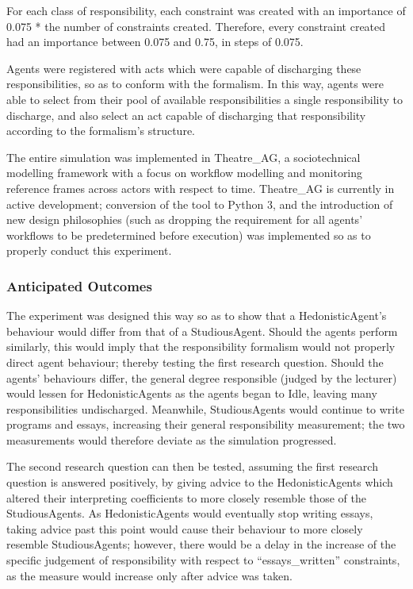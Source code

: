 For each class of responsibility, each constraint was created with an importance of 0.075 * the number of constraints created. Therefore, every constraint created had an importance between 0.075 and 0.75, in steps of 0.075.\par

Agents were registered with acts which were capable of discharging these responsibilities, so as to conform with the formalism. In this way, agents were able to select from their pool of available responsibilities a single responsibility to discharge, and also select an act capable of discharging that responsibility according to the formalism's structure.\par

The entire simulation was implemented in Theatre\_AG\cite{theatre_code}, a sociotechnical modelling framework with a focus on workflow modelling and monitoring reference frames across actors with respect to time. Theatre\_AG is currently in active development; conversion of the tool to Python 3, and the introduction of new design philosophies (such as dropping the requirement for all agents' workflows to be predetermined before execution) was implemented so as to properly conduct this experiment.\par

\subsubsection{Anticipated Outcomes}

The experiment was designed this way so as to show that a HedonisticAgent's behaviour would differ from that of a StudiousAgent. Should the agents perform similarly, this would imply that the responsibility formalism would not properly direct agent behaviour; thereby testing the first research question. Should the agents' behaviours differ, the general degree responsible (judged by the lecturer) would lessen for HedonisticAgents as the agents began to Idle, leaving many responsibilities undischarged. Meanwhile, StudiousAgents would continue to write programs and essays, increasing their general responsibility measurement; the two measurements would therefore deviate as the simulation progressed.\par

The second research question can then be tested, assuming the first research question is answered positively, by giving advice to the HedonisticAgents which altered their interpreting coefficients to more closely resemble those of the StudiousAgents. As HedonisticAgents would eventually stop writing essays, taking advice past this point would cause their behaviour to more closely resemble StudiousAgents; however, there would be a delay in the increase of the specific judgement of responsibility with respect to ``essays\_written'' constraints, as the measure would increase only after advice was taken.\par

